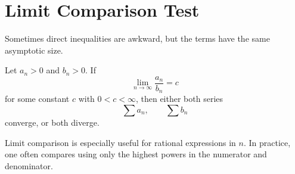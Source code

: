 \section*{Limit Comparison Test}

Sometimes direct inequalities are awkward, but the terms have the same asymptotic size.

\begin{theorem}
Let $a_n>0$ and $b_n>0$. If
$$\lim_{n\to\infty}\frac{a_n}{b_n} = c$$
for some constant $c$ with $0<c<\infty$, then either both series
$$\sum a_n, \qquad \sum b_n$$
converge, or both diverge.
\end{theorem}

\begin{remark}
Limit comparison is especially useful for rational expressions in $n$. In practice, one often compares using only the highest powers in the numerator and denominator.
\end{remark}